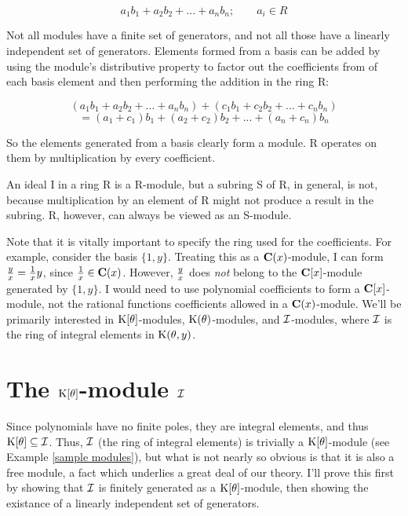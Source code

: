 	$$ a_1 b_1 + a_2 b_2 + ... + a_n b_n; \qquad a_i \in R $$


\enddefinition

Not all modules have a finite set of generators, and not all those
have a linearly independent set of generators.  Elements formed from a
basis can be added by using the module's distributive property to
factor out the coefficients from of each basis element and then
performing the addition in the ring R:

$$ (a_1 b_1 + a_2 b_2 + ... + a_n b_n) + (c_1 b_1 + c_2 b_2 + ... + c_n b_n) $$
$$  = (a_1 + c_1) b_1 + (a_2 + c_2) b_2 + ... + (a_n + c_n) b_n $$

So the elements generated from a basis clearly form a module.  R operates
on them by multiplication by every coefficient.

\example \quad
\label{sample modules}

An ideal I in a ring R is a R-module, but a subring S of R, in
general, is not, because multiplication by an element of R might not
produce a result in the subring.  R, however, can always be viewed as
an S-module.

%

\endexample


Note that it is vitally important to specify the ring used for the
coefficients.  For example, consider the basis $\{1, y\}$.  Treating
this as a ${\bf C}(x)$-module, I can form ${y \over x} = {1 \over x}
y$, since ${1 \over x} \in {\bf C}(x)$.  However, $y \over x$ does
{\it not} belong to the ${\bf C}[x]$-module generated by $\{1, y\}$.
I would need to use polynomial coefficients to form a ${\bf
C}[x]$-module, not the rational functions coefficients allowed in a
${\bf C}(x)$-module.  We'll be primarily interested in ${\rm
K}[\theta]$-modules, ${\rm K}(\theta)$-modules, and ${\cal
I}$-modules, where ${\cal I}$ is the ring of integral elements in
${\rm K}(\theta,y)$.


\section{The ${\rm K}[\theta]$-module ${\cal I}$}

Since polynomials have no finite poles, they are integral elements,
and thus ${\rm K}[\theta] \subseteq {\cal I}$.  Thus, ${\cal I}$ (the
ring of integral elements) is trivially a ${\rm K}[\theta]$-module
(see Example \ref{sample modules}), but what is not nearly so obvious
is that it is also a free module, a fact which underlies a great deal
of our theory.  I'll prove this first by showing that ${\cal I}$ is
finitely generated as a ${\rm K}[\theta]$-module, then showing the
existance of a linearly independent set of generators.


